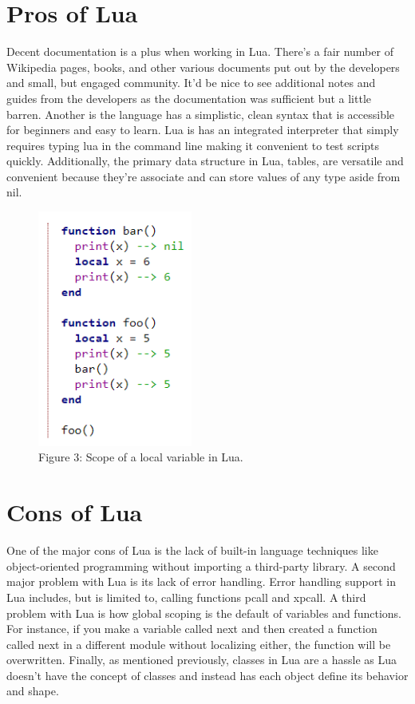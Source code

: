 \documentclass[12pt]{article}
\begin{document}
\section{Pros of Lua}
Decent documentation is a plus when working in Lua.  There's a fair number of Wikipedia pages, books, and other various documents put out by the developers and small, but engaged community.  It'd be nice to see additional notes and guides from the developers as the documentation was sufficient but a little barren.  Another is the language has a simplistic, clean syntax that is accessible for beginners and easy to learn.  Lua is has an integrated interpreter that simply requires typing lua in the command line making it convenient to test scripts quickly.  Additionally, the primary data structure in Lua, tables, are versatile and convenient because they're associate and can store values of any type aside from nil. 

\begin{figure}
\begin{center}
\includegraphics[width=2in]{LuaScope.PNG}
\end{center}
\caption{\label{fig:LuaScope} Figure 3: Scope of a local variable in Lua.}
\end{figure}

\section{Cons of Lua}
One of the major cons of Lua is the lack of built-in language techniques like object-oriented programming without importing a third-party library.  A second major problem with Lua is its lack of error handling.  Error handling support in Lua includes, but is limited to, calling functions pcall and xpcall.  A third problem with Lua is how global scoping is the default of variables and functions.  For instance, if you make a variable called next and then created a function called next in a different module without localizing either, the function will be overwritten. Finally, as mentioned previously, classes in Lua are a hassle as Lua doesn't have the concept of classes and instead has each object define its behavior and shape.
\end{document}
